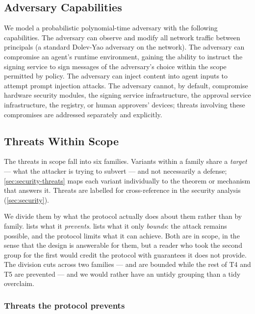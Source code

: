 \documentclass[11pt,a4paper]{article}
\begin{document}
\subsection{Adversary Capabilities}
\label{sec:threat-adversary}

We model a probabilistic polynomial-time adversary with the following
capabilities. The adversary can observe and modify all network traffic
between principals (a standard Dolev-Yao adversary on the network). The
adversary can compromise an agent's runtime environment, gaining the
ability to instruct the signing service to sign messages of the
adversary's choice within the scope permitted by policy. The adversary can
inject content into agent inputs to attempt prompt injection attacks. The
adversary cannot, by default, compromise hardware security modules, the
signing service infrastructure, the approval service infrastructure, the
registry, or human approvers' devices; threats involving these
compromises are addressed separately and explicitly.

\subsection{Threats Within Scope}
\label{sec:threat-scope}

The threats in scope fall into six families. Variants within a family
share a \emph{target} --- what the attacker is trying to subvert --- and
not necessarily a defense; \cref{sec:security-threats} maps each variant
individually to the theorem or mechanism that answers it. Threats are
labelled for cross-reference in the security analysis
(\cref{sec:security}).

We divide them by what the protocol actually does about them rather than
by family.  lists what it \emph{prevents}.
 lists what it only \emph{bounds}: the attack
remains possible, and the protocol limits what it can achieve. Both are
in scope, in the sense that the design is answerable for them, but a
reader who took the second group for the first would credit the protocol
with guarantees it does not provide. The division cuts across two
families ---  and  are bounded while the
rest of T4 and T5 are prevented --- and we would rather have an untidy
grouping than a tidy overclaim.

\subsubsection{Threats the protocol prevents}
\label{sec:threat-within-scope}
\end{document}
